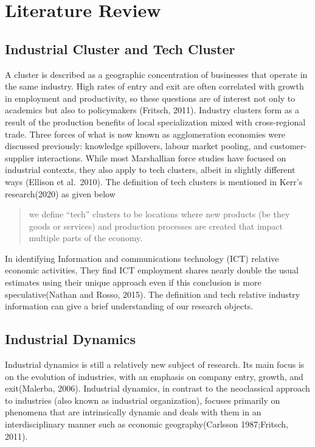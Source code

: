 \documentclass[
  12pt,
  oneside]{book}
\begin{document}
\hypertarget{lit-review}{%
\chapter{Literature Review}\label{lit-review}}

\hypertarget{industrial-cluster-and-tech-cluster}{%
\section{Industrial Cluster and Tech Cluster}\label{industrial-cluster-and-tech-cluster}}

A cluster is described as a geographic concentration of businesses that operate in the same industry. High rates of entry and exit are often correlated with growth in employment and productivity, so these questions are of interest not only to academics but also to policymakers (Fritsch, 2011). Industry clusters form as a result of the production benefits of local specialization mixed with cross-regional trade. Three forces of what is now known as agglomeration economies were discussed previously: knowledge spillovers, labour market pooling, and customer-supplier interactions. While most Marshallian force studies have focused on industrial contexts, they also apply to tech clusters, albeit in slightly different ways (Ellison et al.~2010). The definition of tech clusters is mentioned in Kerr's research(2020) as given below

\begin{quote}
we define ``tech'' clusters to be locations where new products (be they goods or services) and production processes are created that impact multiple parts of the economy.
\end{quote}

In identifying Information and communications technology (ICT) relative economic activities, They find ICT employment shares nearly double the usual estimates using their unique approach even if this conclusion is more speculative(Nathan and Rosso, 2015). The definition and tech relative industry information can give a brief understanding of our research objects.

\hypertarget{industrial-dynamics}{%
\section{Industrial Dynamics}\label{industrial-dynamics}}

Industrial dynamics is still a relatively new subject of research. Its main focus is on the evolution of industries, with an emphasis on company entry, growth, and exit(Malerba, 2006). Industrial dynamics, in contrast to the neoclassical approach to industries (also known as industrial organization), focuses primarily on phenomena that are intrinsically dynamic and deals with them in an interdisciplinary manner such as economic geography(Carlsson 1987;Fritsch, 2011).
\end{document}

